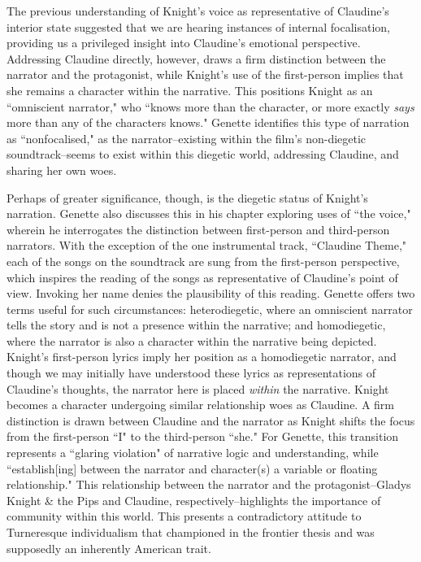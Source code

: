 The previous understanding of Knight's voice as representative of Claudine's interior state suggested that we are hearing instances of internal focalisation, providing us a privileged insight into Claudine's emotional perspective.
Addressing Claudine directly, however, draws a firm distinction between the narrator and the protagonist, while Knight's use of the first-person implies that she remains a character within the narrative.
This positions Knight as an ``omniscient narrator," who ``knows more than the character, or more exactly \textit{says} more than any of the characters knows."\autocite[][189]{genette_narrative_1980}
Genette identifies this type of narration as ``nonfocalised," as the narrator–existing within the film's non-diegetic soundtrack–seems to exist within this diegetic world, addressing Claudine, and sharing her own woes.\autocite[][189]{genette_narrative_1980}

Perhaps of greater significance, though, is the diegetic status of Knight's narration.
Genette also discusses this in his chapter exploring uses of ``the voice," wherein he interrogates the distinction between first-person and third-person narrators.
With the exception of the one instrumental track, ``Claudine Theme," each of the songs on the soundtrack are sung from the first-person perspective, which inspires the reading of the songs as representative of Claudine's point of view.
Invoking her name denies the plausibility of this reading.
Genette offers two terms useful for such circumstances: heterodiegetic, where an omniscient narrator tells the story and is not a presence within the narrative; and homodiegetic, where the narrator is also a character within the narrative being depicted.\autocite[][244-245]{genette_narrative_1980}
Knight's first-person lyrics imply her position as a homodiegetic narrator, and though we may initially have understood these lyrics as representations of Claudine's thoughts, the narrator here is placed \textit{within} the narrative.
Knight becomes a character undergoing similar relationship woes as Claudine.
A firm distinction is drawn between Claudine and the narrator as Knight shifts the focus from the first-person ``I" to the third-person ``she."
For Genette, this transition represents a ``glaring violation" of narrative logic and understanding, while ``establish[ing] between the narrator and character(s) a variable or floating relationship."\autocite[][246]{genette_narrative_1980}
This relationship between the narrator and the protagonist–Gladys Knight \& the Pips and Claudine, respectively–highlights the importance of community within this world.
This presents a contradictory attitude to Turneresque individualism that championed in the frontier thesis and was supposedly an inherently American trait.

